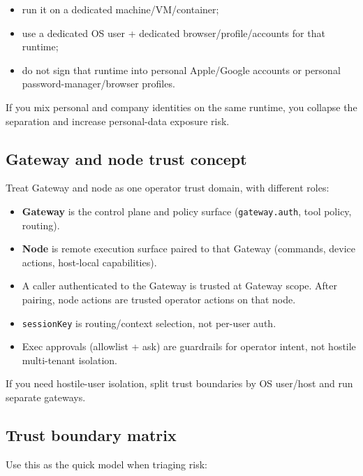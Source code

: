 \begin{itemize}
  \item run it on a dedicated machine/VM/container;
  \item use a dedicated OS user + dedicated browser/profile/accounts for that runtime;
  \item do not sign that runtime into personal Apple/Google accounts or personal password-manager/browser profiles.
\end{itemize}


If you mix personal and company identities on the same runtime, you collapse the separation and increase personal-data exposure risk.

\subsection{Gateway and node trust concept}


Treat Gateway and node as one operator trust domain, with different roles:

\begin{itemize}
  \item \textbf{Gateway} is the control plane and policy surface (\texttt{gateway.auth}, tool policy, routing).
  \item \textbf{Node} is remote execution surface paired to that Gateway (commands, device actions, host-local capabilities).
  \item A caller authenticated to the Gateway is trusted at Gateway scope. After pairing, node actions are trusted operator actions on that node.
  \item \texttt{sessionKey} is routing/context selection, not per-user auth.
  \item Exec approvals (allowlist + ask) are guardrails for operator intent, not hostile multi-tenant isolation.
\end{itemize}


If you need hostile-user isolation, split trust boundaries by OS user/host and run separate gateways.

\subsection{Trust boundary matrix}


Use this as the quick model when triaging risk:


